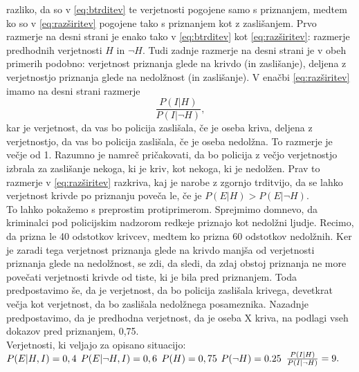\documentclass[mat1, tisk]{fmfdelo}
\theoremstyle{definition} %
\theoremstyle{trditev} %
\theoremstyle{izrek}
\begin{document}
razliko, da so v \eqref{eq:btrditev} te verjetnosti pogojene samo s priznanjem, medtem ko so v \eqref{eq:razširitev} pogojene tako s priznanjem kot z zaslišanjem. Prvo razmerje na desni strani je enako 
tako v \eqref{eq:btrditev} kot \eqref{eq:razširitev}: razmerje predhodnih verjetnosti $H$ in $\neg H$. Tudi zadnje razmerje na desni strani je v obeh primerih podobno: verjetnost priznanja glede na 
krivdo (in zaslišanje), deljena z verjetnostjo priznanja glede na nedolžnost (in zaslišanje). V enačbi \eqref{eq:razširitev} imamo na desni strani razmerje 
\[\frac{P(I \lvert H)}{P(I \lvert \neg H)},\] kar je verjetnost, da vas bo policija zaslišala, če je oseba kriva, deljena z verjetnostjo, da vas bo policija 
zaslišala, če je oseba nedolžna. To razmerje je večje od 1. Razumno je namreč pričakovati, da bo policija z večjo verjetnostjo izbrala za zaslišanje nekoga, 
ki je kriv, kot nekoga, ki je nedolžen. Prav to razmerje v \eqref{eq:razširitev} razkriva, kaj je narobe z zgornjo trditvijo, da se lahko verjetnost krivde po priznanju poveča le, 
če je $P(E \lvert H) > P(E \lvert \neg H)$. \\
To lahko pokažemo s preprostim protiprimerom. Sprejmimo domnevo, da kriminalci pod policijskim nadzorom redkeje priznajo kot nedolžni ljudje. Recimo, da prizna 
le 40 odstotkov krivcev, medtem ko prizna 60 odstotkov nedolžnih. Ker je zaradi tega verjetnost priznanja glede na krivdo manjša od verjetnosti priznanja glede 
na nedolžnost, se zdi, da sledi, da zdaj obstoj priznanja ne more povečati verjetnosti krivde od tiste, ki je bila pred priznanjem. Toda predpostavimo še, 
da je verjetnost, da bo policija zaslišala krivega, devetkrat večja kot verjetnost, da bo zaslišala nedolžnega posameznika. Nazadnje predpostavimo, da je 
predhodna verjetnost, da je oseba X kriva, na podlagi vseh dokazov pred priznanjem, 0,75. \\
Verjetnosti, ki veljajo za opisano situacijo:\\ \vspace{2mm}
$P(E \lvert H, I) = 0,4\\ \vspace{2mm}$
$P(E \lvert \neg H, I) = 0,6\\ \vspace{2mm}$
$P(H) = 0,75\\ \vspace{2mm}$
$P(\neg H) = 0.25\\ \vspace{2mm}$
$\frac{P(I \lvert H)}{P(I \lvert \neg H)} = 9.\\ \vspace{2mm}$
\end{document}
